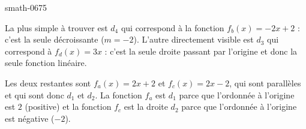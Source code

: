 
\begin{corrige}{smath-0675}

    La plus simple à trouver est \( d_4\) qui correspond à la fonction \( f_b(x)=-2x+2\) : c'est la seule décroissante (\( m=-2\)). L'autre directement visible est \( d_3\) qui correspond à \( f_d(x)=3x\) : c'est la seule droite passant par l'origine et donc la seule fonction linéaire.

    Les deux restantes sont \( f_a(x)=2x+2\) et \( f_c(x)=2x-2\), qui sont parallèles et qui sont donc \( d_1\) et \( d_2\). La fonction \( f_a\) est \( d_1\) parce que l'ordonnée à l'origine est \( 2\) (positive) et la fonction \( f_c\) est la droite \( d_2\) parce que l'ordonnée à l'origine est négative (\( -2\)).

\end{corrige}
